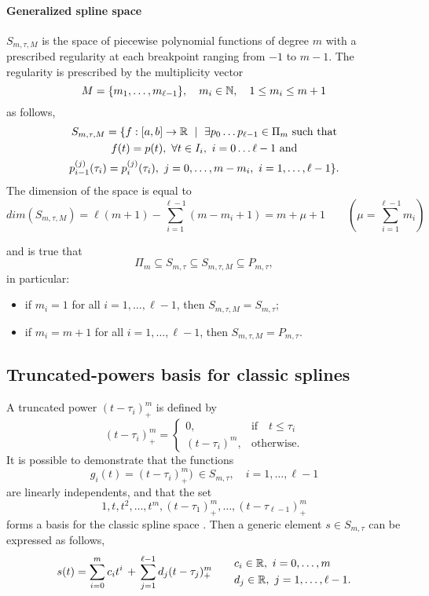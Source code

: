 \documentclass[dissertation.tex]{subfiles}
\begin{document}
\paragraph{Generalized spline space} $S_{m,\tau,M}$ is the
space of piecewise polynomial functions of degree $m$ with a prescribed
regularity at each breakpoint ranging from $-1$ to $m-1$. The
regularity is prescribed by the multiplicity vector
$$
M=\{m_1,\dots,m_{\ell-1}\},\quad m_i\in\mathbb{N},\quad 1\leq m_i\leq m+1
$$
as follows,
\begin{multline*}
  S_{m,\tau,M}=\{f:[a,b]\rightarrow\mR\ \mid\ \exists p_0\dots
  p_{\ell-1}\in\Pi_m \ \text{such that}\\
  f(t)=p(t),\ \forall t\in I_i,\
  i=0\dots \ell-1\ \text{and}\\
  p_{i-1}^{(j)}(\tau_i)=p_{i}^{(j)}(\tau_i),\ j=0,\dots,m-m_i,\ i=1,\dots,\ell-1\}.
\end{multline*}
The dimension of the space is equal to 
\begin{equation*}
  dim(S_{m,\tau,M})=\ell(m+1)-\sum_{i=1}^{\ell-1}(m-m_i+1)=m+\mu +1\qquad(\mu=\sum_{i=1}^{\ell-1}m_i)  
\end{equation*}

and is true that
$$
\Pi_m\subseteq S_{m,\tau}\subseteq S_{m,\tau,M}\subseteq P_{m,\tau},
$$
in particular:
\begin{itemize}
  \item if $m_i=1$ for all $i=1,\dots,\ell-1$, then
    $S_{m,\tau,M}=S_{m,\tau}$;
  \item if $m_i=m+1$ for all $i=1,\dots,\ell-1$, then
    $S_{m,\tau,M}=P_{m,\tau}$.
\end{itemize}

\subsection{Truncated-powers basis for classic
  splines}\label{sec:truncpow}
A truncated power $(t-\tau_i)_+^m$ is
defined by
$$
(t-\tau_i)_+^m=
\begin{cases}
  0,&\mbox{if}\quad t\leq\tau_i\\
  (t-\tau_i)^m, &\mbox{otherwise}.
\end{cases}
$$
It is possible to demonstrate that the functions
$$
g_i(t)=(t-\tau_i)_+^m)\ \in S_{m,\tau},\quad i=1,\dots,\ell-1
$$
are linearly independents, and that the set
$$
1,t,t^2,\dots,t^m,(t-\tau_1)_+^m,\dots,(t-\tau_{\ell-1})_+^m
$$
forms a basis for the classic spline space \cite{deboor}. Then a
generic element $s\in S_{m,\tau}$ can be expressed as follows,
\begin{equation}\label{eq:classicSplineElement}
  s(t)=\sum_{i=0}^m c_i t^i\, +\, \sum_{j=1}^{\ell-1} d_j
  (t-\tau_j)_+^m\qquad
  \begin{split}
    &c_i\in\mathbb{R},\ i=0,\dots,m\\
    &d_j\in\mathbb{R},\ j=1,\dots,\ell-1.
  \end{split}
\end{equation}
\end{document}
